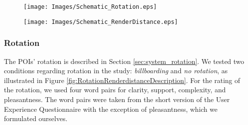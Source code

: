 \begin{figure*}
    \centering
    \begin{subfigure}[b]{.55\textwidth}
        \centering
        \texttt{[image: Images/Schematic\_Rotation.eps]}
        \Description{}
    \end{subfigure}
    \hfill
    \begin{subfigure}{.4\textwidth}
        \centering
        \texttt{[image: Images/Schematic\_RenderDistance.eps]}
    \end{subfigure}
    \caption{Schematic representation of the two study conditions manipulating the POIs' rotation (left) and render distance (right).}
    \label{fig:RotationRenderdistanceDescription}
\end{figure*}

\subsubsection*{\textbf{Rotation}}
The POIs' rotation is described in Section \ref{sec:system_rotation}. We tested two conditions regarding rotation in the study: \textit{billboarding} and \textit{no rotation}, as illustrated in Figure \ref{fig:RotationRenderdistanceDescription}. For the rating of the rotation, we used four word pairs for clarity, support, complexity, and pleasantness. The word pairs were taken from the short version of the User Experience Questionnaire \cite{schrepp2017design} with the exception of pleasantness, which we formulated ourselves.
  

